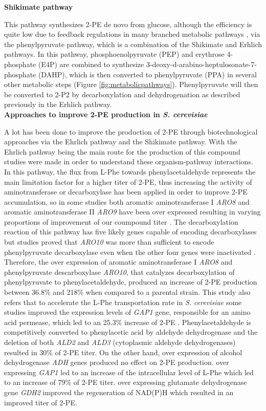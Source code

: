 \documentclass[runningheads]{llncs}
\begin{document}
\textbf{Shikimate pathway}

This pathway synthesizes 2-PE de novo from glucose, although the efficiency is quite low due to feedback regulations in many branched metabolic pathways \cite{yin2015improving}, via the phenylpyruvate pathway, which is a combination of the Shikimate and Erhlich pathways. In this pathway, phosphoenolpyruvate (PEP) and erythrose 4-phosphate (E4P) are combined to synthesize 3-deoxy-d-arabino-heptulosonate-7-phosphate (DAHP), which is then converted to phenylpyruvate (PPA) in several other metabolic steps (Figure \ref{fig:metabolicpathways}). Phenylpyruvate will then be converted to 2-P2 by decarboxylation and dehydrogenation as described previously in the Erhlich pathway. \\

\textbf{Approaches to improve 2-PE production in \emph{S. cerevisiae}}

A lot has been done to improve the production of 2-PE through biotechnological approaches via the Ehrlich pathway and the Shikimate pathway. With the Ehrlich pathway being the main route for the production of this compound studies were made in order to understand these organism-pathway interactions. In this pathway, the flux from L-Phe towards phenylacetaldehyde represents the main limitation factor for a higher titer of 2-PE, thus increasing the activity of aminotransferase or decarboxylase has been applied in order to improve 2-PE accumulation, so in some studies both aromatic aminotransferase I \emph{ARO8} and aromatic aminotransferase II \emph{ARO9} have been over expressed resulting in varying proportions of improvement of our coumpound titer \cite{kim2014metabolic,yin2015improving}. The decarboxylation reaction of this pathway has five likely genes capable of encoding decarboxylases but studies proved that \emph{ARO10} was more than sufficient to encode phenylpyruvate decarboxylase even when the other four genes were inactivated \cite{yin2015improving,wang2019advances}. Therefore, the over expression of aromatic aminotransferase I \emph{ARO8} and phenylpyruvate descarboxylase \emph{ARO10}, that catalyzes decarboxylation of phenylpyruvate to phenylacetaldehyde, produced an increase of 2-PE production between 36.8\% and 218\% when compared to a parental strain. This study also refers that to accelerate the L-Phe transportation rate in \emph{S. cerevisiae} some studies improved the expression levels of \emph{GAP1} gene, responsible for an amino acid permease, which led to an 25.3\% increase of 2-PE \cite{qian2019current,wang2019advances}. Phenylacetaldehyde is competitively converted to phenylacetic acid by aldehyde dehydrogenase and the deletion of both \emph{ALD2} and \emph{ALD3} (cytoplasmic aldehyde dehydrogenases) resulted in 30\% of 2-PE titer. On the other hand, over expression of alcohol dehydrogenase \emph{ADH} genes produced no effect on 2-PE production. over expressing \emph{GAP1} led to an increase of the intracellular level of L-Phe which led to an increase of 79\% of 2-PE titer. over expressing glutamate dehydrogenase gene \emph{GDH2} improved the regeneration of NAD(P)H which resulted in an improved titer of 2-PE. \cite{wang2019advances} 
\end{document}
